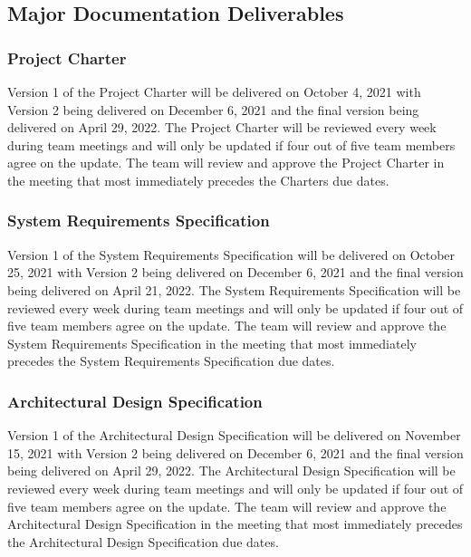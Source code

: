 
\subsection{Major Documentation Deliverables}
\subsubsection{Project Charter}
Version 1 of the Project Charter will be delivered on October 4, 2021 with Version 2 being delivered on December 6, 2021 and the final version being delivered on  April 29, 2022. The Project Charter will be reviewed every week during team meetings and will only be updated if four out of five team members agree on the update. The team will review and approve the Project Charter in the meeting that most immediately precedes the Charters due dates.

\subsubsection{System Requirements Specification}
Version 1 of the System Requirements Specification will be delivered on October 25, 2021 with Version 2 being delivered on December 6, 2021 and the final version being delivered on April 21, 2022. The System Requirements Specification will be reviewed every week during team meetings and will only be updated if four out of five team members agree on the update. The team will review and approve the System Requirements Specification in the meeting that most immediately precedes the System Requirements Specification due dates.

\subsubsection{Architectural Design Specification}
Version 1 of the Architectural Design Specification will be delivered on November 15, 2021 with Version 2 being delivered on December 6, 2021 and the final version being delivered on April 29, 2022. The Architectural Design Specification will be reviewed every week during team meetings and will only be updated if four out of five team members agree on the update. The team will review and approve the Architectural Design Specification in the meeting that most immediately precedes the Architectural Design Specification due dates.

